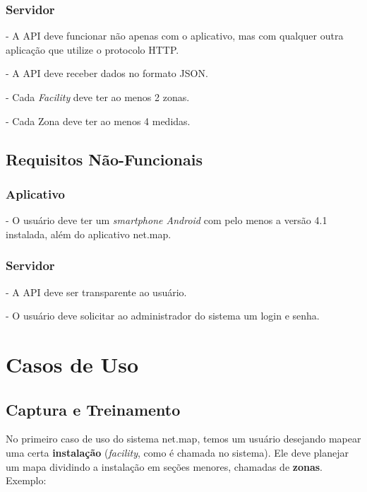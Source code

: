 \subsubsection{Servidor}
- A API deve funcionar não apenas com o aplicativo, mas com qualquer outra aplicação que utilize o protocolo HTTP.\par
- A API deve receber dados no formato JSON.\par
- Cada \textit{Facility} deve ter ao menos 2 zonas.\par
- Cada Zona deve ter ao menos 4 medidas.\par


\subsection{Requisitos Não-Funcionais}

\subsubsection{Aplicativo}
- O usuário deve ter um \textit{smartphone Android} com pelo menos a versão 4.1 instalada, além do aplicativo net.map.\par
\subsubsection{Servidor}
- A API deve ser transparente ao usuário.\par
- O usuário deve solicitar ao administrador do sistema um login e senha.\par



\section{Casos de Uso}

\subsection{Captura e Treinamento}

No primeiro caso de uso do sistema net.map, temos um usuário desejando mapear uma certa \textbf{instalação} (\textit{facility}, como é chamada no sistema). Ele deve planejar um mapa dividindo a instalação em seções menores, chamadas de \textbf{zonas}. Exemplo:

